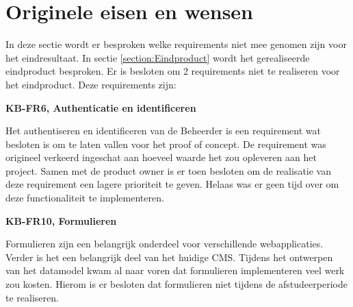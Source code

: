 \section{Originele eisen en wensen}
In deze sectie wordt er besproken welke requirements niet mee genomen zijn voor het eindresultaat.
In sectie \ref{section:Eindproduct} wordt het gerealiseerde eindproduct besproken.
Er is besloten om 2 requirements niet te realiseren voor het eindproduct.
Deze requirements zijn: 

\whitespace
\textbf{KB-FR6, Authenticatie en identificeren}

\whitespace
Het authentiseren en identificeren van de \gls{Beheerder} is een requirement wat besloten is om te laten vallen voor het proof of concept.
De requirement was origineel verkeerd ingeschat aan hoeveel waarde het zou opleveren aan het project.
Samen met de product owner is er toen besloten om de realisatie van deze requirement een lagere prioriteit te geven.
Helaas was er geen tijd over om deze functionaliteit te implementeren.

\whitespace
\textbf{KB-FR10, Formulieren}

\whitespace
Formulieren zijn een belangrijk onderdeel voor verschillende webapplicaties.
Verder is het een belangrijk deel van het huidige \gls{CMS}.
Tijdens het ontwerpen van het datamodel kwam al naar voren dat formulieren implementeren veel werk zou kosten.
Hierom is er besloten dat formulieren niet tijdens de afstudeerperiode te realiseren.
